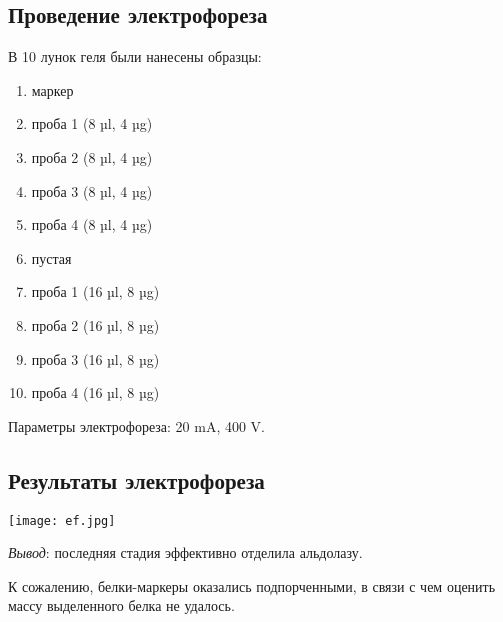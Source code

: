\subsection{Проведение электрофореза}
\label{ef}
В 10 лунок геля были нанесены образцы:
\begin{enumerate}
\item маркер
\item проба 1 (8 µl, 4 µg)
\item проба 2 (8 µl, 4 µg)
\item проба 3 (8 µl, 4 µg)
\item проба 4 (8 µl, 4 µg)
\item пустая
\item проба 1 (16 µl, 8 µg)
\item проба 2 (16 µl, 8 µg)
\item проба 3 (16 µl, 8 µg)
\item проба 4 (16 µl, 8 µg)
\end{enumerate}

Параметры электрофореза: 20 mA, 400 V.

\subsection{Результаты электрофореза}
\texttt{[image: ef.jpg]}

\emph{Вывод}: последняя стадия эффективно отделила альдолазу.

К сожалению, белки-маркеры оказались подпорченными,
в связи с чем оценить массу выделенного белка не удалось.

